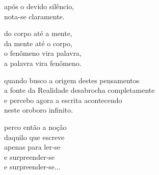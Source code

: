 após o devido silêncio,\\
nota-se claramente.

do corpo até a mente,\\
da mente até o corpo,\\
o fenômeno vira palavra,\\
a palavra vira fenômeno.

quando busco a origem destes pensamentos\\
a fonte da Realidade desabrocha completamente\\
e percebo agora a escrita acontecendo\\
neste oroboro infinito.

perco então a noção\\
daquilo que escreve\\
apenas para ler-se\\
e surpreender-se\\
e surpreender-se...
